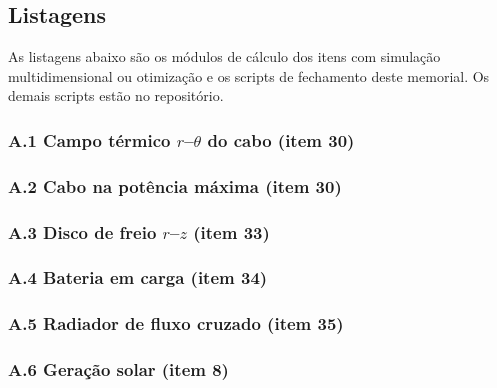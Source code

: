 \subsection*{Listagens}
As listagens abaixo são os módulos de cálculo dos itens com simulação multidimensional ou
otimização e os scripts de fechamento deste memorial. Os demais scripts estão no repositório.

\subsubsection*{A.1 Campo térmico $r$--$\theta$ do cabo (item 30)}
\noindent{}\par

\subsubsection*{A.2 Cabo na potência máxima (item 30)}
\noindent{}\par

\subsubsection*{A.3 Disco de freio $r$--$z$ (item 33)}
\noindent{}\par

\subsubsection*{A.4 Bateria em carga (item 34)}
\noindent{}\par

\subsubsection*{A.5 Radiador de fluxo cruzado (item 35)}
\noindent{}\par

\subsubsection*{A.6 Geração solar (item 8)}
\noindent{}\par

